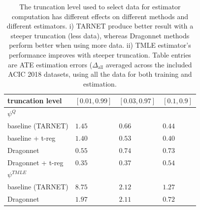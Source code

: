 \documentclass{article}
\begin{document}
 \begin{table}[h] 

\centering
 \captionsetup{width=0.75\linewidth}
  \caption{The truncation level used to select data for estimator computation has different effects on different methods and different estimators. i) TARNET produce better result with a steeper truncation (less data), whereas Dragonnet methods perform better when using more data. ii) TMLE estimator's performance improves with steeper truncation. Table entries are ATE estimation errors ($\Delta_{\mathrm{all}}$ averaged across the included ACIC 2018 datasets, using all the data for both training and estimation.\label{tb:truncation-sensitivity} }
      \label{tb:trunctaion0.01}
  \vspace{1em}
 \begin{tabular}{llll}
    truncation level   & $[0.01, 0.99]$   & $[0.03, 0.97]$ & $[0.1, 0.9]$   \\
          \midrule
   $\psi^{Q}$\\

\midrule
   baseline (TARNET) &$1.45 $ & $0.66 $ & $0.44$\\
  baseline + t-reg & $1.40$ &  $0.53$ & $0.40$\\
   Dragonnet & $0.55$ & $0.74$ & $0.73$  \\
   Dragonnet + t-reg & 
    $0.35$ & $0.37$ & $0.54$ \\
    \midrule
     $\psi^{TMLE}$\\
     \midrule
      baseline (TARNET) &$8.75$ & $2.12 $ & $1.27$\\
   Dragonnet & $1.97$ & $2.11$ &$0.72$ \\
   \bottomrule
\end{tabular}
\end{table}


\newpage
 
\end{document}
